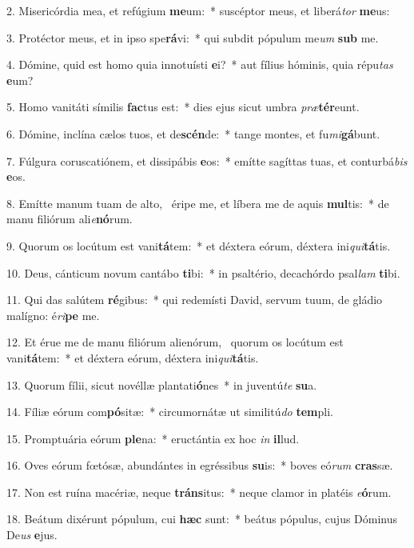 2. Misericórdia mea, et refúgium \textbf{me}um:~*  suscéptor meus, et liberá\textit{tor} \textbf{me}us:\

3. Protéctor meus, et in ipso spe\textbf{rá}vi:~*  qui subdit pópulum me\textit{um} \textbf{sub} me.\

4. Dómine, quid est homo quia innotuísti \textbf{e}i?~*  aut fílius hóminis, quia répu\textit{tas} \textbf{e}um?\

5. Homo vanitáti símilis \textbf{fac}tus est:~*  dies ejus sicut umbra \textit{præ}\textbf{tér}eunt.\

6. Dómine, inclína cælos tuos, et de\textbf{scén}de:~*  tange montes, et fu\textit{mi}\textbf{gá}bunt.\

7. Fúlgura coruscatiónem, et dissipábis \textbf{e}os:~*  emítte sagíttas tuas, et conturbá\textit{bis} \textbf{e}os.\

8. Emítte manum tuam de alto, \dag\  éripe me, et líbera me de aquis \textbf{mul}tis:~*  de manu filiórum ali\textit{e}\textbf{nó}rum.\

9. Quorum os locútum est vani\textbf{tá}tem:~*  et déxtera eórum, déxtera ini\textit{qui}\textbf{tá}tis.\

10. Deus, cánticum novum cantábo \textbf{ti}bi:~*  in psaltério, decachórdo psal\textit{lam} \textbf{ti}bi.\

11. Qui das salútem \textbf{ré}gibus:~*  qui redemísti David, servum tuum, de gládio malígno: é\textit{ri}\textbf{pe} me.\

12. Et érue me de manu filiórum alienórum, \dag\  quorum os locútum est vani\textbf{tá}tem:~*  et déxtera eórum, déxtera ini\textit{qui}\textbf{tá}tis.\

13. Quorum fílii, sicut novéllæ plantati\textbf{ó}nes~*  in juventú\textit{te} \textbf{su}a.\

14. Fíliæ eórum com\textbf{pó}sitæ:~*  circumornátæ ut similitú\textit{do} \textbf{tem}pli.\

15. Promptuária eórum \textbf{ple}na:~*  eructántia ex hoc \textit{in} \textbf{il}lud.\

16. Oves eórum fœtósæ, abundántes in egréssibus \textbf{su}is:~*  boves eó\textit{rum} \textbf{cras}sæ.\

17. Non est ruína macériæ, neque \textbf{tráns}itus:~*  neque clamor in platéis \textit{e}\textbf{ó}rum.\

18. Beátum dixérunt pópulum, cui \textbf{hæc} sunt:~*  beátus pópulus, cujus Dóminus De\textit{us} \textbf{e}jus.\


